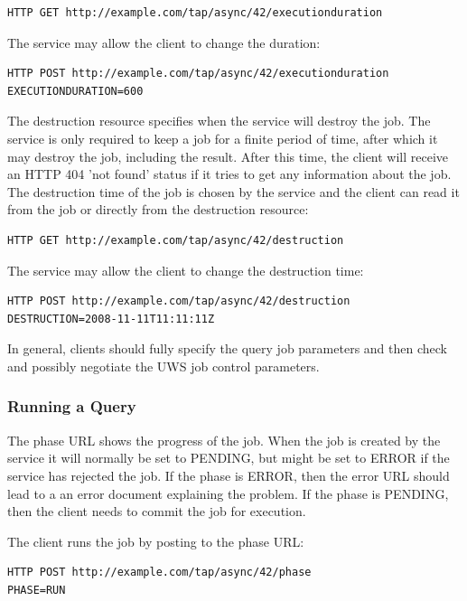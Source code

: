 \documentclass[11pt,letter]{ivoa}
\begin{document}
\begin{verbatim}
HTTP GET http://example.com/tap/async/42/executionduration
\end{verbatim}
The service may allow the client to change the duration:
\begin{verbatim}
HTTP POST http://example.com/tap/async/42/executionduration
EXECUTIONDURATION=600
\end{verbatim}

The destruction resource specifies when the service will destroy the job. The 
service is only required to keep a job for a finite period of time, after which 
it may destroy the job, including the result. After this time, the client will 
receive an HTTP 404 'not found' status if it tries to get any information about 
the job. The destruction time of the job is chosen by the service and the client 
can read it from the job or directly from the destruction resource:
\begin{verbatim}
HTTP GET http://example.com/tap/async/42/destruction
\end{verbatim}
The service may allow the client to change the destruction time:
\begin{verbatim}
HTTP POST http://example.com/tap/async/42/destruction
DESTRUCTION=2008-11-11T11:11:11Z
\end{verbatim}

In general, clients should fully specify the query job parameters and then 
check and possibly negotiate the UWS job control parameters.

\subsubsection{Running a Query}
The phase URL shows the progress of the job. When the job is created by the 
service it will normally be set to PENDING, but might be set to ERROR if the 
service has rejected the job. If the phase is ERROR, then the error URL should 
lead to a an error document explaining the problem. If the phase is PENDING, 
then the client needs to commit the job for execution.

The client runs the job by posting to the phase URL:
\begin{verbatim}
HTTP POST http://example.com/tap/async/42/phase
PHASE=RUN
\end{verbatim}
\end{document}
